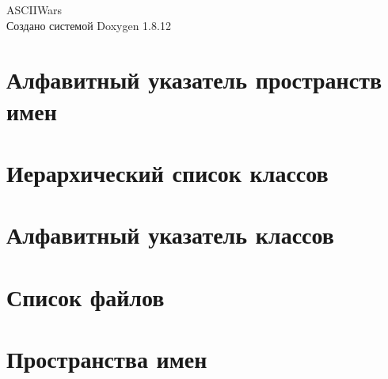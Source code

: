 \documentclass[twoside]{book}
\newcommand{\+}{\discretionary{\mbox{\scriptsize$\hookleftarrow$}}{}{}}
\newcommand{\clearemptydoublepage}{%
  \newpage{\pagestyle{empty}\cleardoublepage}%
}
\begin{document}
\hypersetup{pageanchor=false,
             bookmarksnumbered=true,
             pdfencoding=unicode
            }
\begin{titlepage}
\vspace*{7cm}
\begin{center}%
{\Large A\+S\+C\+I\+I\+Wars }\\
\vspace*{1cm}
{\large Создано системой Doxygen 1.8.12}\\
\end{center}
\end{titlepage}
\clearemptydoublepage
{}
\tableofcontents
\clearemptydoublepage
{}
\hypersetup{pageanchor=true}

\chapter{Алфавитный указатель пространств имен}

\chapter{Иерархический список классов}

\chapter{Алфавитный указатель классов}

\chapter{Список файлов}

\chapter{Пространства имен}




\end{document}
